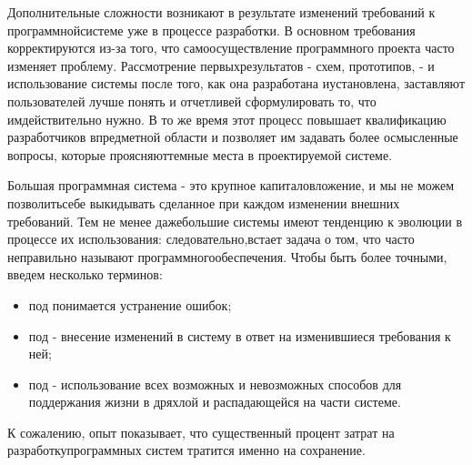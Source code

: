 \documentclass[11pt]{article}
\begin{document}
Дополнительные сложности возникают в результате изменений требований к программной\linebreak системе уже в процессе разработки. В основном требования корректируются из-за того, что само\linebreak осуществление программного проекта часто изменяет проблему. Рассмотрение первых\linebreak результатов - схем, прототипов, - и использование системы после того, как она разработана и\linebreak установлена, заставляют пользователей лучше понять и отчетливей сформулировать то, что им\linebreak действительно нужно. В то же время этот процесс повышает квалификацию разработчиков в\linebreak предметной области и позволяет им задавать более осмысленные вопросы, которые проясняют\linebreak темные места в проектируемой системе. \bigskip

Большая программная система - это крупное капиталовложение, и мы не можем позволить\linebreak себе выкидывать сделанное при каждом изменении внешних требований. Тем не менее даже\linebreak большие системы имеют тенденцию к эволюции в процессе их использования: следовательно,\linebreak встает задача о том, что часто неправильно называют  программного\linebreak обеспечения. \rm Чтобы быть более точными, введем несколько терминов: 
\begin{itemize}
\item под  \rm понимается устранение ошибок;
\item под  \rm - внесение изменений в систему в ответ на изменившиеся требования к ней;
\item под  \rm - использование всех возможных и невозможных способов для поддержания жизни в дряхлой и распадающейся на части системе.
\end{itemize}

К сожалению, опыт показывает, что существенный процент затрат на разработку\linebreak программных систем тратится именно на сохранение. \bigskip
\end{document}
